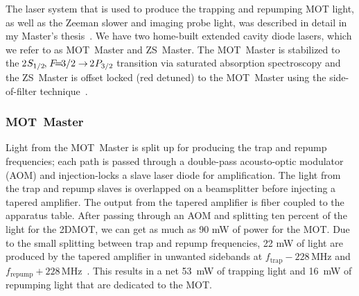 

The laser system that is used to produce the trapping and repumping MOT light,
as well as the Zeeman slower and imaging probe light, was described in detail
in my Master's thesis~\cite{DuarteMs}.    We have two home-built extended
cavity diode lasers, which we refer to as MOT~Master and ZS~Master. The
MOT~Master is stabilized to the $\twos{1/2}\cm\f{3/2}\rightarrow\twop{3/2}$
transition via saturated absorption spectroscopy and the ZS~Master is offset
locked (red detuned) to the MOT~Master using the side-of-filter
technique~\cite{SoftLock2004}.  

\subsubsection{MOT~Master} 

Light from the MOT~Master is split up for producing the trap and repump
frequencies; each path is passed through a double-pass acousto-optic modulator
(AOM) and injection-locks a slave laser diode for amplification.  The light
from the trap and repump slaves is overlapped on a beamsplitter before
injecting a tapered amplifier.  The output from the tapered amplifier is fiber
coupled to the apparatus table.  After passing through an AOM and splitting ten
percent of the light for the 2DMOT, we can get as much as 90 mW of power for
the MOT.   Due to the small splitting between trap and repump frequencies, 22
mW of light are produced by the tapered amplifier in unwanted sidebands at
\mbox{$f_{\mathrm{trap}}-228\,\mathrm{MHz}$} and
\mbox{$f_{\mathrm{repump}}+228\,\mathrm{MHz}$}~\cite{Ferrari1999}. This results
in a net 53~mW of trapping light and 16~mW of repumping light that are
dedicated to the MOT.  

